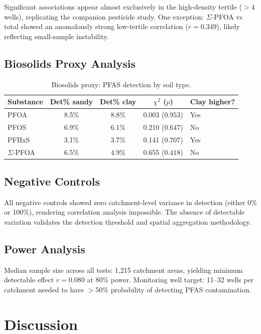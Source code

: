\documentclass[12pt,a4paper]{article}
\begin{document}
\noindent Significant associations appear almost exclusively in the high-density tertile ($>$4 wells), replicating the companion pesticide study. One exception: $\Sigma$-PFOA vs total showed an anomalously strong low-tertile correlation ($r = 0.349$), likely reflecting small-sample instability.

\subsection{Biosolids Proxy Analysis}

\begin{table}[H]
\centering
\caption{Biosolids proxy: PFAS detection by soil type.}
\begin{tabular}{@{}lcccl@{}}
\toprule
Substance & Det\% sandy & Det\% clay & $\chi^2$ ($p$) & Clay higher? \\
\midrule
PFOA & 8.5\% & 8.8\% & 0.003 ($0.953$) & Yes \\
PFOS & 6.9\% & 6.1\% & 0.210 ($0.647$) & No \\
PFHxS & 3.1\% & 3.7\% & 0.141 ($0.707$) & Yes \\
$\Sigma$-PFOA & 6.5\% & 4.9\% & 0.655 ($0.418$) & No \\
\bottomrule
\end{tabular}
\end{table}

\subsection{Negative Controls}

All negative controls showed zero catchment-level variance in detection (either 0\% or 100\%), rendering correlation analysis impossible. The absence of detectable variation validates the detection threshold and spatial aggregation methodology.

\subsection{Power Analysis}

Median sample size across all tests: 1,215 catchment areas, yielding minimum detectable effect $r = 0.080$ at 80\% power. Monitoring well target: 11--32 wells per catchment needed to have $>$50\% probability of detecting PFAS contamination.

\section{Discussion}
\end{document}
